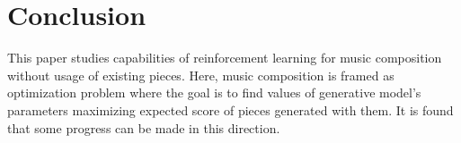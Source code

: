 \documentclass{article}
\begin{document}
\section{Conclusion}
\label{sec:conclusion}


This paper studies capabilities of reinforcement learning for music composition without usage of existing pieces. Here, music composition is framed as optimization problem where the goal is to find values of generative model's parameters maximizing expected score of pieces generated with them. It is found that some progress can be made in this direction.




  

\end{document}

